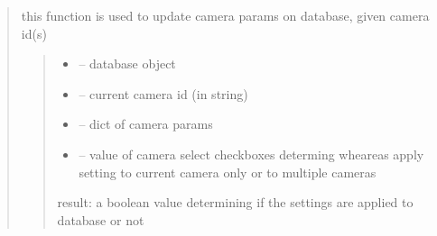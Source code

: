 \documentclass[letterpaper,10pt,english]{sphinxmanual}
\begin{document}
\begin{quote}
\begin{savenotes}
\begin{fulllineitems}
\end{fulllineitems}\end{savenotes}


\begin{savenotes}\begin{fulllineitems}
\label{\detokenize{setting/backend/camera_funcs:oxin.backend.camera_funcs.set_camera_params_to_db}}
\pysigstartsignatures
{}
\pysigstopsignatures
\sphinxAtStartPar
this function is used to update camera params on database, given camera id(s)
\begin{quote}\begin{description}
\begin{itemize}
\item {} 
\sphinxAtStartPar
{} – database object

\item {} 
\sphinxAtStartPar
{} – current camera id (in string)

\item {} 
\sphinxAtStartPar
{} – dict of camera params

\item {} 
\sphinxAtStartPar
{} – value of camera select checkboxes determing wheareas apply setting to current camera only or to multiple cameras

\end{itemize}

\sphinxAtStartPar
result: a boolean value determining if the settings are applied to database or not

\end{description}\end{quote}

\end{fulllineitems}\end{savenotes}


\end{quote}
\end{document}

